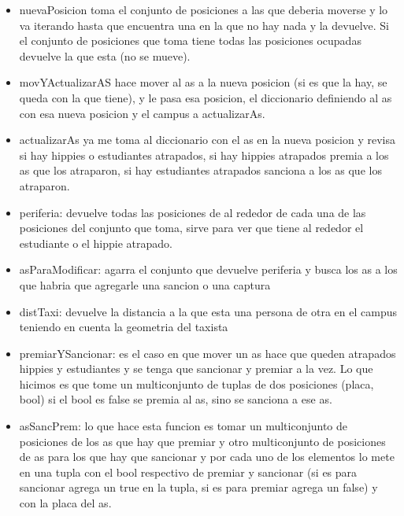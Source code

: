 \documentclass[10pt, a4paper]{article}
\begin{document}
\begin{itemize}

\item nuevaPosicion toma el conjunto de posiciones a las que deberia moverse y lo va iterando hasta que encuentra una en la que no hay nada y la devuelve. Si el conjunto de posiciones que toma tiene todas las posiciones ocupadas devuelve la que esta (no se mueve).

\item movYActualizarAS hace mover al as a la nueva posicion (si es que la hay, se queda con la que tiene), y le pasa esa posicion, el diccionario definiendo al as con esa nueva posicion y el campus a actualizarAs.

\item actualizarAs ya me toma al diccionario con el as en la nueva posicion y revisa si hay hippies o estudiantes atrapados, si hay hippies atrapados premia a los as que los atraparon, si hay estudiantes atrapados sanciona a los as que los atraparon.

\item periferia: devuelve todas las posiciones de al rededor de cada una de las posiciones del conjunto que toma, sirve para ver que tiene al rededor el estudiante o el hippie atrapado.

\item asParaModificar: agarra el conjunto que devuelve periferia y busca los as a los que habria que agregarle una sancion o una captura

\item distTaxi: devuelve la distancia a la que esta una persona de otra en el campus teniendo en cuenta la geometria del taxista

\item premiarYSancionar: es el caso en que mover un as hace que queden atrapados hippies y estudiantes y se tenga que sancionar y premiar a la vez. Lo que hicimos es que tome un multiconjunto de tuplas de dos posiciones (placa, bool) si el bool es false se premia al as, sino se sanciona a ese as.

\item asSancPrem: lo que hace esta funcion es tomar un multiconjunto de posiciones de los as que hay que premiar y otro multiconjunto de posiciones de as para los que hay que sancionar y por cada uno de los elementos lo mete en una tupla con el bool respectivo de premiar y sancionar (si es para sancionar agrega un true en la tupla, si es para premiar agrega un false) y con la placa del as.

\end{itemize}
\end{document}
